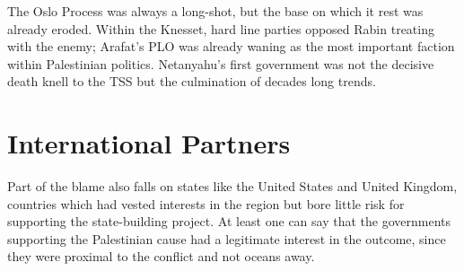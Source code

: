 \documentclass[letterpaper,12pt,twoside]{article} %
\begin{document}
\begin{multicols}{2}
The Oslo Process was always a long-shot, but the base on which it rest was already eroded. Within the Knesset, hard line parties opposed Rabin treating with the enemy; Arafat's PLO was already waning as the most important faction within Palestinian politics. Netanyahu's first government was not the decisive death knell to the TSS but the culmination of decades long trends.

\section{International Partners}

Part of the blame also falls on states like the United States and United Kingdom, countries which had vested interests in the region but bore little risk for supporting the state-building project. At least one can say that the governments supporting the Palestinian cause had a legitimate interest in the outcome, since they were proximal to the conflict and not oceans away. 


\end{multicols}

\nocite{kelman2018onetwo}
\nocite{lustick2019paradigm}
\nocite{kear2022wasatiyyah}
\nocite{omalley2017israel}
\nocite{scheindlin2016confederalism}
\nocite{munayyer2019there}
\nocite{gordon2012western}
\nocite{farsakh2011one}

\vfill
\pagebreak
\printbibliography
\end{document}
